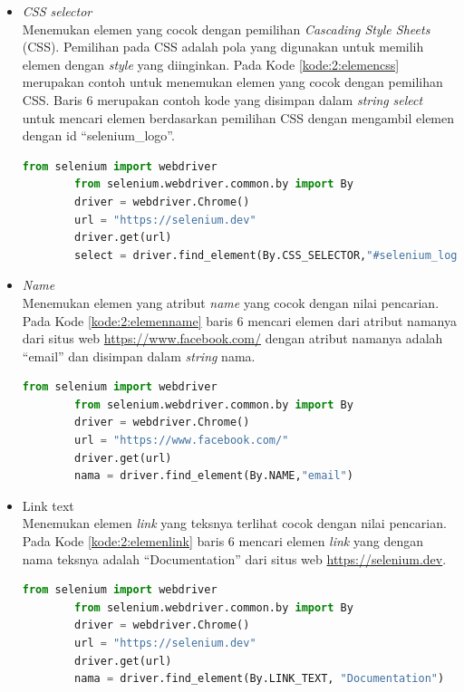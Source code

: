 \begin{itemize}
	\item \textit{CSS selector}\\
	Menemukan elemen yang cocok dengan pemilihan \textit{Cascading Style Sheets} (CSS). Pemilihan pada CSS adalah pola yang digunakan untuk memilih elemen dengan \textit{style} yang diinginkan. Pada Kode \ref{kode:2:elemencss} merupakan contoh untuk menemukan elemen yang cocok dengan pemilihan CSS. Baris 6 merupakan contoh kode yang disimpan dalam \textit{string} \textit{select} untuk mencari elemen berdasarkan pemilihan CSS dengan mengambil elemen dengan id ``selenium\_logo''.
	\begin{lstlisting}[language=python, caption=Contoh kode untuk menemukan elemen dengan \textit{CSS selector}, label=kode:2:elemencss]
		from selenium import webdriver
		from selenium.webdriver.common.by import By
		driver = webdriver.Chrome()
		url = "https://selenium.dev"
		driver.get(url)
		select = driver.find_element(By.CSS_SELECTOR,"#selenium_logo")
	\end{lstlisting}
	
	\item \textit{Name}\\
	Menemukan elemen yang atribut \textit{name} yang cocok dengan nilai pencarian. Pada Kode \ref{kode:2:elemenname} baris 6 mencari elemen dari atribut namanya dari situs web \url{https://www.facebook.com/} dengan atribut namanya adalah ``email'' dan disimpan dalam \textit{string} nama.
	\begin{lstlisting}[language=python, caption=Contoh kode untuk menemukan elemen dengan atribut nama, label=kode:2:elemenname]
		from selenium import webdriver
		from selenium.webdriver.common.by import By
		driver = webdriver.Chrome()
		url = "https://www.facebook.com/"
		driver.get(url)
		nama = driver.find_element(By.NAME,"email")
	\end{lstlisting}
	
	\item Link text\\
	Menemukan elemen \textit{link} yang teksnya terlihat cocok dengan nilai pencarian. Pada Kode \ref{kode:2:elemenlink} baris 6 mencari elemen \textit{link} yang dengan nama teksnya adalah ``Documentation'' dari situs web \url{https://selenium.dev}.
	\begin{lstlisting}[language=python, caption=Contoh kode untuk menemukan elemen dengan \textit{link text}, label=kode:2:elemenlink]
		from selenium import webdriver
		from selenium.webdriver.common.by import By
		driver = webdriver.Chrome()
		url = "https://selenium.dev"
		driver.get(url)
		nama = driver.find_element(By.LINK_TEXT, "Documentation")
	\end{lstlisting}
	

\end{itemize}
